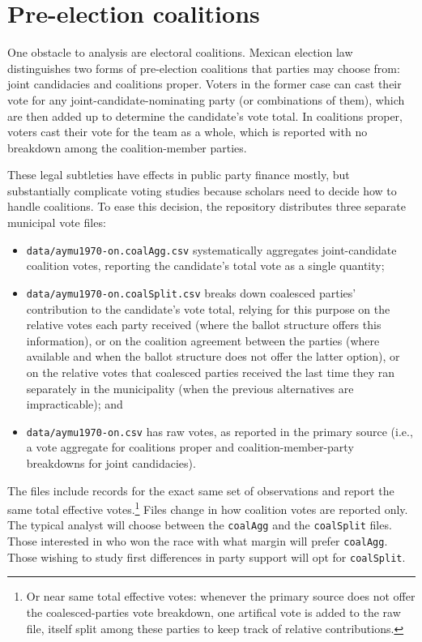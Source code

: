 \documentclass[letter,12pt]{article}
\begin{document}
\section{Pre-election coalitions}\label{S:coalitions}

One obstacle to analysis are electoral coalitions. Mexican election law distinguishes two forms of pre-election coalitions that parties may choose from: joint candidacies and coalitions proper. Voters in the former case can cast their vote for any joint-candidate-nominating party (or combinations of them), which are then added up to determine the candidate's vote total. In coalitions proper, voters cast their vote for the team as a whole, which is reported with no breakdown among the coalition-member parties.

These legal subtleties have effects in public party finance mostly, but substantially complicate voting studies because scholars need to decide how to handle coalitions. To ease this decision, the repository distributes three separate municipal vote files: 

\begin{itemize}
\item \verb|data/aymu1970-on.coalAgg.csv| systematically aggregates joint-candidate coalition votes, reporting the candidate's total vote as a single quantity;
\item \verb|data/aymu1970-on.coalSplit.csv| breaks down coalesced parties' contribution to the candidate's vote total, relying for this purpose on the relative votes each party received (where the ballot structure offers this information), or on the coalition agreement between the parties (where available and when the ballot structure does not offer the latter option), or on the relative votes that coalesced parties received the last time they ran separately in the municipality (when the previous alternatives are impracticable); and
\item \verb|data/aymu1970-on.csv| has raw votes, as reported in the primary source (i.e., a vote aggregate for coalitions proper and coalition-member-party breakdowns for joint candidacies).
\end{itemize}

\noindent The files include records for the exact same set of observations and report the same total effective votes.\footnote{Or near same total effective votes: whenever the primary source does not offer the coalesced-parties vote breakdown, one artifical vote is added to the raw file, itself split among these parties to keep track of relative contributions.} Files change in how coalition votes are reported only. The typical analyst will choose between the \verb|coalAgg| and the \verb|coalSplit| files. Those interested in who won the race with what margin will prefer \verb|coalAgg|. Those wishing to study first differences in party support will opt for \verb|coalSplit|.
\end{document}
